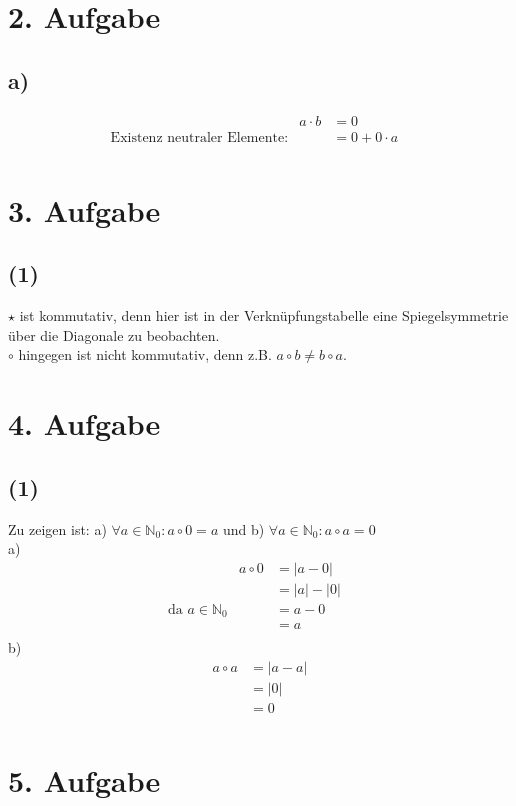 \documentclass[]{article}
\begin{document}
\section*{2. Aufgabe}
\subsection*{a)}
	\begin{align*}
		&& a \cdot b &= 0 &&\\
		&\text{Existenz neutraler Elemente:}& &= 0 + 0 \cdot a &&\\
	\end{align*}
\section*{3. Aufgabe}
\subsection*{(1)}
	$\star$ ist kommutativ, denn hier ist in der Verknüpfungstabelle eine Spiegelsymmetrie über die Diagonale zu beobachten.\\
	$\circ$ hingegen ist nicht kommutativ, denn z.B. $a \circ b \neq b \circ a$.

\section*{4. Aufgabe}
\subsection*{(1)}
	Zu zeigen ist: a) $\forall a \in \mathbb{N}_0: a \circ 0 = a$ und b) $\forall a \in \mathbb{N}_0: a \circ a = 0$\\
	a)
	\begin{align*}
		&& a \circ 0 &= |a-0| &&\\
		&& &= |a|-|0| &&\\
		&\text{da $a\in\mathbb{N}_0$}& &= a-0 &&\\
		&& &= a &&\\
	\end{align*}
	b)
	\begin{align*}
		&& a \circ a &= |a-a| &&\\
		&& &= |0| &&\\
		&& &= 0 &&\\
	\end{align*}

\section*{5. Aufgabe}
\end{document}
